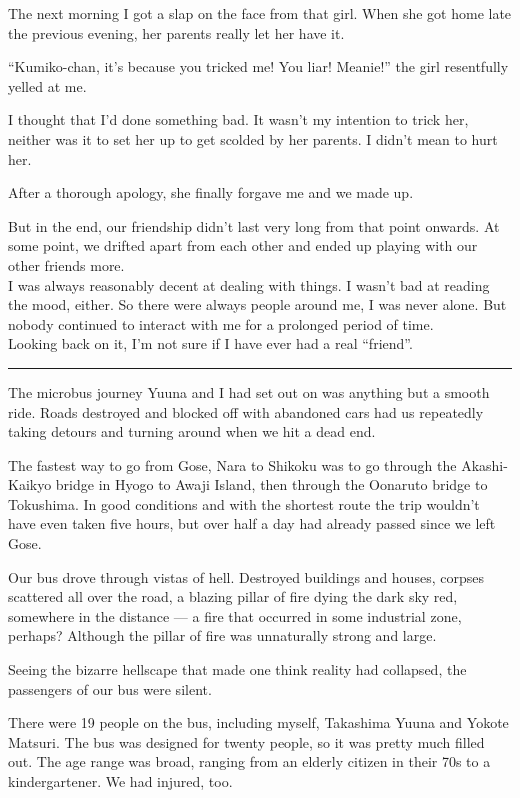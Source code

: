 The next morning I got a slap on the face from that girl. When she got home late the previous evening, her parents really let her have it.

``Kumiko-chan, it's because you tricked me! You liar! Meanie!'' the girl resentfully yelled at me.

I thought that I'd done something bad. It wasn't my intention to trick her, neither was it to set her up to get scolded by her parents. I didn't mean to hurt her.

After a thorough apology, she finally forgave me and we made up.

But in the end, our friendship didn't last very long from that point onwards. At some point, we drifted apart from each other and ended up playing with our other friends more. \\
I was always reasonably decent at dealing with things. I wasn't bad at reading the mood, either. So there were always people around me, I was never alone. But nobody continued to interact with me for a prolonged period of time. \\
Looking back on it, I'm not sure if I have ever had a real ``friend''.

\vspace{\baselineskip}
\hrule
\vspace{\baselineskip}

The microbus journey Yuuna and I had set out on was anything but a smooth ride. Roads destroyed and blocked off with abandoned cars had us repeatedly taking detours and turning around when we hit a dead end.

The fastest way to go from Gose, Nara to Shikoku was to go through the Akashi-Kaikyo bridge in Hyogo to Awaji Island, then through the Oonaruto bridge to Tokushima. In good conditions and with the shortest route the trip wouldn't have even taken five hours, but over half a day had already passed since we left Gose.

Our bus drove through vistas of hell. Destroyed buildings and houses, corpses scattered all over the road, a blazing pillar of fire dying the dark sky red, somewhere in the distance --- a fire that occurred in some industrial zone, perhaps? Although the pillar of fire was unnaturally strong and large.

Seeing the bizarre hellscape that made one think reality had collapsed, the passengers of our bus were silent.

There were 19 people on the bus, including myself, Takashima Yuuna and Yokote Matsuri. The bus was designed for twenty people, so it was pretty much filled out. The age range was broad, ranging from an elderly citizen in their 70s to a kindergartener. We had injured, too.


